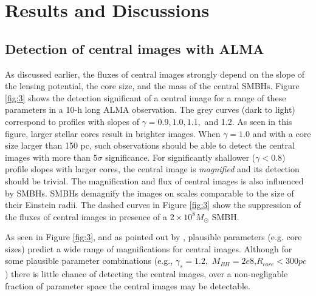 \documentclass[chicago]{emulateapj}
\newcommand{\red}{\textcolor{red}}
\begin{document}




\section{Results and Discussions}
\subsection{Detection of central images with ALMA}
As discussed earlier, the fluxes of central images strongly depend on the slope of the lensing potential, the core size, and the mass of the central SMBHs.  Figure \ref{fig:3} shows the detection significant of a central image for a range of these parameters in a 10-h long ALMA observation. The grey curves (dark to light) correspond to profiles with slopes of $\gamma=0.9, 1.0, 1.1,$ and 1.2.  As seen in this figure, larger stellar cores result in brighter images. %
When $\gamma=1.0$ and with a core size larger than 150 pc, such observations should be able to detect the central images with more than $5\sigma$ significance. For significantly shallower ($\gamma<0.8$) profile slopes with larger cores, the central image is \emph{magnified} and its detection should be trivial.  The magnification and flux of central images is also influenced by SMBHs.
SMBHs demagnify the images on scales comparable to the size of their Einstein radii.
The dashed curves in Figure \ref{fig:3} show the suppression of the fluxes of central images in presence of a $2\times10^8M_{\odot}$ SMBH.

As seen in Figure \ref{fig:3}, and as pointed out by \citet{Keeton:03}, plausible parameters (e.g. core sizes) predict  a wide range of magnifications for   central images. Although for some plausible parameter combinations (e.g., $\gamma_{s}=1.2,$ $M_{BH} = 2e8$,$R_{core}<300 pc$ ) there is little chance of detecting the central images, over a non-negligable fraction of parameter space the central images may be detectable. 
\end{document}
